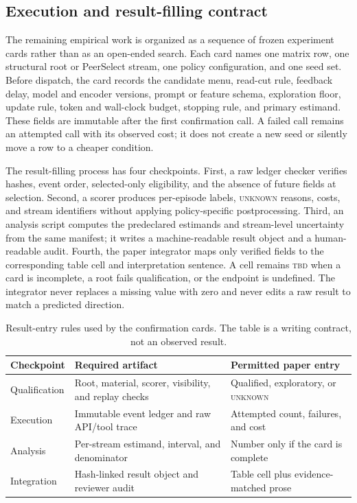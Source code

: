 \documentclass[sigconf,anonymous]{aamas}
\newcommand{\unknown}{\textsc{unknown}}
\begin{document}
\subsection{Execution and result-filling contract}
The remaining empirical work is organized as a sequence of frozen experiment cards rather than as an open-ended search. Each card names one matrix row, one structural root or PeerSelect stream, one policy configuration, and one seed set. Before dispatch, the card records the candidate menu, read-cut rule, feedback delay, model and encoder versions, prompt or feature schema, exploration floor, update rule, token and wall-clock budget, stopping rule, and primary estimand. These fields are immutable after the first confirmation call. A failed call remains an attempted call with its observed cost; it does not create a new seed or silently move a row to a cheaper condition.

The result-filling process has four checkpoints. First, a raw ledger checker verifies hashes, event order, selected-only eligibility, and the absence of future fields at selection. Second, a scorer produces per-episode labels, \unknown{} reasons, costs, and stream identifiers without applying policy-specific postprocessing. Third, an analysis script computes the predeclared estimands and stream-level uncertainty from the same manifest; it writes a machine-readable result object and a human-readable audit. Fourth, the paper integrator maps only verified fields to the corresponding table cell and interpretation sentence. A cell remains \textsc{tbd} when a card is incomplete, a root fails qualification, or the endpoint is undefined. The integrator never replaces a missing value with zero and never edits a raw result to match a predicted direction.

\begin{table}[t]
\centering\scriptsize
\setlength{\tabcolsep}{2.5pt}
\caption{Result-entry rules used by the confirmation cards. The table is a writing contract, not an observed result.}
\label{tab:result-contract}
\begin{tabular}{p{}p{}p{}}
\toprule
Checkpoint & Required artifact & Permitted paper entry \\
\midrule
Qualification & Root, material, scorer, visibility, and replay checks & Qualified, exploratory, or \unknown{} \\
Execution & Immutable event ledger and raw API/tool trace & Attempted count, failures, and cost \\
Analysis & Per-stream estimand, interval, and denominator & Number only if the card is complete \\
Integration & Hash-linked result object and reviewer audit & Table cell plus evidence-matched prose \\
\bottomrule
\end{tabular}
\end{table}
\end{document}
